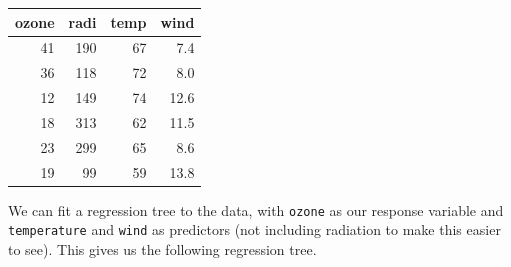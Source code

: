 \documentclass[ignorenonframetext,]{beamer}
\begin{document}
\begin{frame}[fragile]

\begin{tabular}{r|r|r|r}
\hline
ozone & radi & temp & wind\\
\hline
41 & 190 & 67 & 7.4\\
\hline
36 & 118 & 72 & 8.0\\
\hline
12 & 149 & 74 & 12.6\\
\hline
18 & 313 & 62 & 11.5\\
\hline
23 & 299 & 65 & 8.6\\
\hline
19 & 99 & 59 & 13.8\\
\hline
\end{tabular}

We can fit a regression tree to the data, with \texttt{ozone} as our
response variable and \texttt{temperature} and \texttt{wind} as
predictors (not including radiation to make this easier to see). This
gives us the following regression tree.

\end{frame}
\end{document}
